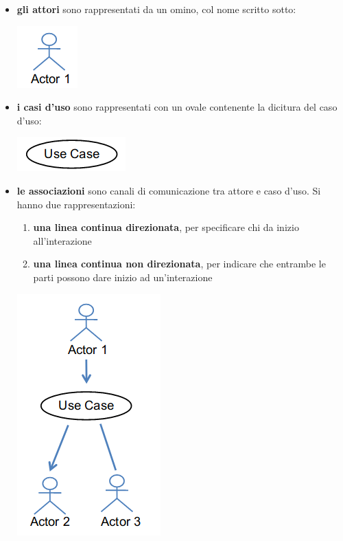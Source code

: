 \documentclass[a4paper,12pt, oneside]{book}
\begin{document}
\begin{itemize}
	\item \textbf{gli attori} sono rappresentati da un omino, col nome scritto sotto:
	\begin{center}
		\includegraphics[scale=0.7]{img/act.png}
	\end{center}
	\item \textbf{i casi d'uso} sono rappresentati con un ovale contenente la dicitura del caso d'uso:
	\begin{center}
		\includegraphics[scale=0.7]{img/dcas.png}
	\end{center}
	\newpage
	\item \textbf{le associazioni} sono canali di comunicazione tra attore e caso d'uso. Si hanno due rappresentazioni:
	\begin{enumerate}
		\item \textbf{una linea continua direzionata}, per specificare chi da inizio all'interazione
		\item \textbf{una linea continua non direzionata}, per indicare che entrambe le parti possono dare inizio ad un'interazione
	\end{enumerate}
	\begin{center}
		\includegraphics[scale=0.7]{img/asso.png}

\end{center}
\end{itemize}
\end{document}
